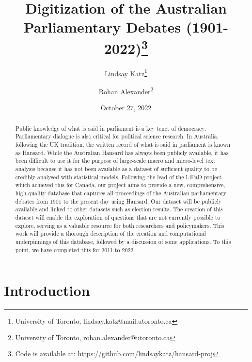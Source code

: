 \documentclass[
  letterpaper,
  DIV=11,
  numbers=noendperiod]{scrartcl}
\title{Digitization of the Australian Parliamentary Debates
(1901-2022)\footnote{Code is available at:
  https://github.com/lindsaykatz/hansard-proj}}
\author{Lindsay Katz\footnote{University of Toronto,
  lindsay.katz@mail.utoronto.ca} \and Rohan Alexander\footnote{University
  of Toronto, rohan.alexander@utoronto.ca}}
\date{October 27, 2022}
\begin{document}
\maketitle
\begin{abstract}
Public knowledge of what is said in parliament is a key tenet of
democracy. Parliamentary dialogue is also critical for political science
research. In Australia, following the UK tradition, the written record
of what is said in parliament is known as Hansard. While the Australian
Hansard has always been publicly available, it has been difficult to use
it for the purpose of large-scale macro and micro-level text analysis
because it has not been available as a dataset of sufficient quality to
be credibly analysed with statistical models. Following the lead of the
LiPaD project which achieved this for Canada, our project aims to
provide a new, comprehensive, high-quality database that captures all
proceedings of the Australian parliamentary debates from 1901 to the
present day using Hansard. Our dataset will be publicly available and
linked to other datasets such as election results. The creation of this
dataset will enable the exploration of questions that are not currently
possible to explore, serving as a valuable resource for both researchers
and policymakers. This work will provide a thorough description of the
creation and computational underpinnings of this database, followed by a
discussion of some applications. To this point, we have completed this
for 2011 to 2022.
\end{abstract}
\ifdefined\Shaded\renewenvironment{Shaded}{\begin{tcolorbox}[borderline west={3pt}{0pt}{shadecolor}, interior hidden, sharp corners, breakable, frame hidden, enhanced, boxrule=0pt]}{\end{tcolorbox}}\fi

\hypertarget{sec-intro}{%
\section{Introduction}\label{sec-intro}}
\end{document}
